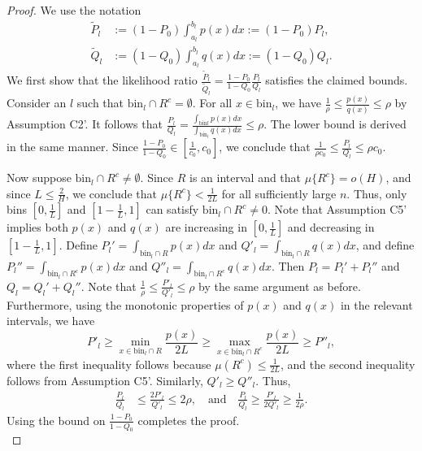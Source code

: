 \documentclass{article}
\newcommand{\bin}{\text{bin}}
\begin{document}
\begin{proof}
We use the notation
\begin{align*}
\tilde P_l & := (1- P_0) \int_{a_l}^{b_l} p(x) dx := (1-P_0) P_l, \\
\tilde Q_l & := (1-Q_0)\int_{a_l}^{b_l} q(x) dx := (1-Q_0) Q_l.
\end{align*}
We first show that the likelihood ratio $\frac{\tilde P_l}{\tilde Q_l} = \frac{1-P_0}{1-Q_0} \frac{P_l}{Q_l}$ satisfies the claimed bounds. Consider an $l$ such that $\bin_l \cap R^c = \emptyset$. For all $x \in \bin_l$, we have $\frac{1}{\rho} \leq \frac{p(x)}{q(x)} \leq \rho$ by Assumption C2'. It follows that $\frac{P_l}{Q_l} = \frac{\int_{\bin l} p(x)dx}{\int_{\bin_l} q(x)dx} \leq \rho.$ The lower bound is derived in the same manner. Since $\frac{1-P_0}{1-Q_0} \in \left[\frac{1}{c_0}, c_0\right]$, we conclude that $\frac{1}{\rho c_0} \le \frac{P_l}{Q_l} \le \rho c_0$.

Now suppose $\bin_l \cap R^c \neq \emptyset$. Since $R$ is an interval and that $\mu\{R^c\} = o(H)$, and since $L \leq \frac{2}{H}$, we conclude that $\mu\{R^c\} < \frac{1}{2L}$ for all sufficiently large $n$. Thus, only bins $[0, \frac{1}{L}]$ and $[1-\frac{1}{L}, 1]$ can satisfy $\bin_l \cap R^c \neq 0$. Note that Assumption C5' implies both $p(x)$ and $q(x)$ are increasing in $\left[0, \frac{1}{L}\right]$ and decreasing in $\left[1-\frac{1}{L}, 1\right]$. Define $P_l' = \int_{\bin_l \cap R} p(x) dx$ and $Q'_l = \int_{\bin_l \cap R} q(x) dx$, and define $P_l'' = \int_{\bin_l \cap R^c} p(x) dx$ and $Q''_l = \int_{\bin_l \cap R^c} q(x) dx$. Then $P_l = P_l' + P_l''$ and $Q_l = Q_l' + Q_l''$. Note that $\frac{1}{\rho} \leq \frac{P'_l}{Q'_l} \leq \rho$ by the same argument as before. Furthermore, using the monotonic properties of $p(x)$ and $q(x)$ in the relevant intervals, we have
\[
P'_l \geq \min_{x \in \bin_l \cap R} \frac{p(x)}{2L} \geq \max_{x \in \bin_l \cap R^c} \frac{p(x)}{2L} \geq P''_l,
\]
where the first inequality follows because $\mu(R^c) \leq \frac{1}{2L}$, and the second inequality follows from Assumption C5'. Similarly, $Q'_l \geq Q''_l$. Thus,
\begin{align*}
\frac{P_l}{Q_l} &\leq \frac{2 P'_l}{ Q'_l} \leq 2\rho, \quad \text{and} \quad \frac{P_l}{Q_l} \geq \frac{P'_l}{2 Q'_l} \geq \frac{1}{2\rho}.
\end{align*}
Using the bound on $\frac{1-P_0}{1-Q_0}$ completes the proof.\\


\end{proof}
\end{document}
